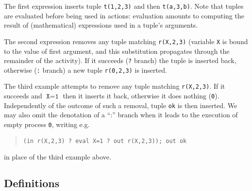 \documentclass[12pt,a4paper,twoside,openright]{book}
\begin{document}
\noindent The first expression inserts tuple \texttt{t(1,2,3)} and then \texttt{t(a,3,b)}.
%
Note that tuples are evaluated before being used in actions: evaluation amounts to computing the result of (mathematical) expressions used in a tuple's arguments.

The second expression removes any tuple matching \texttt{r(X,2,3)} (variable \texttt{X} is bound to the value of first argument, and this substitution propagates through the remainder of the activity).
%
If it succeeds (\texttt{?} branch) the tuple is inserted back, otherwise (\texttt{:} branch) a new tuple \texttt{r(0,2,3)} is inserted.

The third example attempts to remove any tuple matching \texttt{r(X,2,3)}.
%
If it succeeds and $\texttt{X}=\texttt{1}$ then it inserts it back, otherwise it does nothing (\texttt{0}).
%
Independently of the outcome of such a removal, tuple \texttt{ok} is then inserted.
%
We may also omit the denotation of a ``:'' branch when it leads to the execution of empty process \texttt{0}, writing e.g.
{\begin{quote}
\begin{verbatim}
(in r(X,2,3) ? eval X=1 ? out r(X,2,3)); out ok
\end{verbatim}\end{quote}
}
\noindent
in place of the third example above.

\subsection{Definitions}
\end{document}

